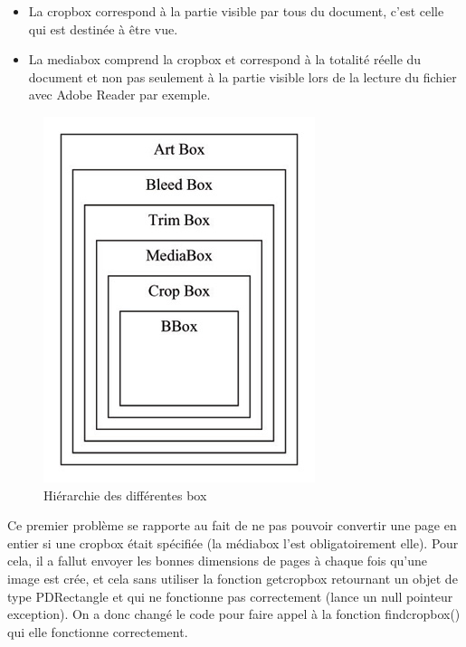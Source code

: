 		\begin{itemize}
			\item La cropbox correspond  à la partie visible par tous du document, 
                  c'est celle qui est destinée à être vue.
			\item La mediabox comprend la cropbox et correspond à la totalité 
                  réelle du document et non pas seulement à la partie visible 
                  lors de la lecture du fichier avec Adobe Reader par exemple. 
		\end{itemize}

    
     \begin{figure}[h]
            \begin{center}
            \includegraphics[scale=0.6]{crop_media_box.jpg} 
            \end{center}
            \caption{Hiérarchie des différentes box}
            \label{Hiérarchie des différentes box}
     \end{figure}

	        Ce premier problème se rapporte au fait de ne pas pouvoir convertir
        une page en entier si une cropbox était spécifiée (la médiabox l'est 
        obligatoirement elle). Pour cela, il a fallut envoyer les bonnes dimensions 
        de pages à chaque fois qu'une image est crée, et cela sans utiliser la fonction
        getcropbox retournant un objet de type PDRectangle et qui ne fonctionne 
        pas correctement (lance un null pointeur exception). On a donc changé le
        code pour faire appel à la fonction findcropbox() qui elle fonctionne 
        correctement.


